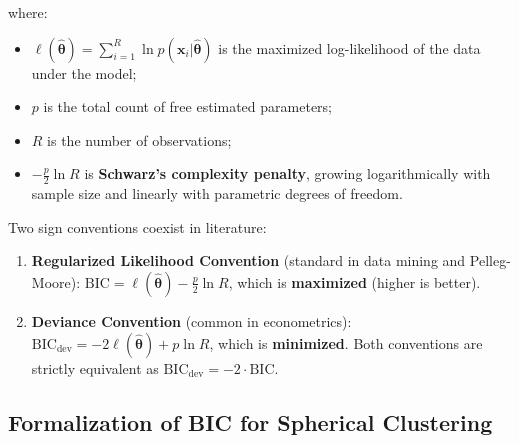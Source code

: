 where:
\begin{itemize}
    \item $\ell(\hat{\boldsymbol{\theta}}) = \sum_{i=1}^R \ln p(\mathbf{x}_i | \hat{\boldsymbol{\theta}})$ is the maximized log-likelihood of the data under the model;
    \item $p$ is the total count of free estimated parameters;
    \item $R$ is the number of observations;
    \item $-\frac{p}{2} \ln R$ is \textbf{Schwarz's complexity penalty}, growing logarithmically with sample size and linearly with parametric degrees of freedom.
\end{itemize}

\begin{remark}
Two sign conventions coexist in literature:
\begin{enumerate}
    \item \textbf{Regularized Likelihood Convention} (standard in data mining and Pelleg-Moore): $\mathrm{BIC} = \ell(\hat{\boldsymbol{\theta}}) - \frac{p}{2} \ln R$, which is \textbf{maximized} (higher is better).
    \item \textbf{Deviance Convention} (common in econometrics): $\mathrm{BIC}_{\text{dev}} = -2 \ell(\hat{\boldsymbol{\theta}}) + p \ln R$, which is \textbf{minimized}. Both conventions are strictly equivalent as $\mathrm{BIC}_{\text{dev}} = -2 \cdot \mathrm{BIC}$.
\end{enumerate}
\end{remark}

\subsection{Formalization of BIC for Spherical Clustering}

